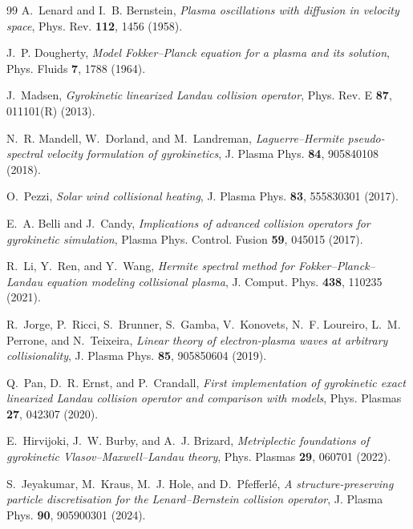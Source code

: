 \documentclass[11pt]{article}
\begin{document}
\begin{thebibliography}{99}
A.~Lenard and I.~B. Bernstein, \emph{Plasma oscillations with diffusion in velocity space}, Phys. Rev. \textbf{112}, 1456 (1958).

J.~P. Dougherty, \emph{Model Fokker--Planck equation for a plasma and its solution}, Phys. Fluids \textbf{7}, 1788 (1964).

J.~Madsen, \emph{Gyrokinetic linearized Landau collision operator}, Phys. Rev. E \textbf{87}, 011101(R) (2013).

N.~R. Mandell, W.~Dorland, and M.~Landreman, \emph{Laguerre--Hermite pseudo-spectral velocity formulation of gyrokinetics}, J. Plasma Phys. \textbf{84}, 905840108 (2018).

O.~Pezzi, \emph{Solar wind collisional heating}, J. Plasma Phys. \textbf{83}, 555830301 (2017).

E.~A. Belli and J.~Candy, \emph{Implications of advanced collision operators for gyrokinetic simulation}, Plasma Phys. Control. Fusion \textbf{59}, 045015 (2017).

R.~Li, Y.~Ren, and Y.~Wang, \emph{Hermite spectral method for Fokker--Planck--Landau equation modeling collisional plasma}, J. Comput. Phys. \textbf{438}, 110235 (2021).

R.~Jorge, P.~Ricci, S.~Brunner, S.~Gamba, V.~Konovets, N.~F. Loureiro, L.~M. Perrone, and N.~Teixeira, \emph{Linear theory of electron-plasma waves at arbitrary collisionality}, J. Plasma Phys. \textbf{85}, 905850604 (2019).

Q.~Pan, D.~R. Ernst, and P.~Crandall, \emph{First implementation of gyrokinetic exact linearized Landau collision operator and comparison with models}, Phys. Plasmas \textbf{27}, 042307 (2020).

E.~Hirvijoki, J.~W. Burby, and A.~J. Brizard, \emph{Metriplectic foundations of gyrokinetic Vlasov--Maxwell--Landau theory}, Phys. Plasmas \textbf{29}, 060701 (2022).

S.~Jeyakumar, M.~Kraus, M.~J. Hole, and D.~Pfefferl\'e, \emph{A structure-preserving particle discretisation for the Lenard--Bernstein collision operator}, J. Plasma Phys. \textbf{90}, 905900301 (2024).
\end{thebibliography}
\end{document}

